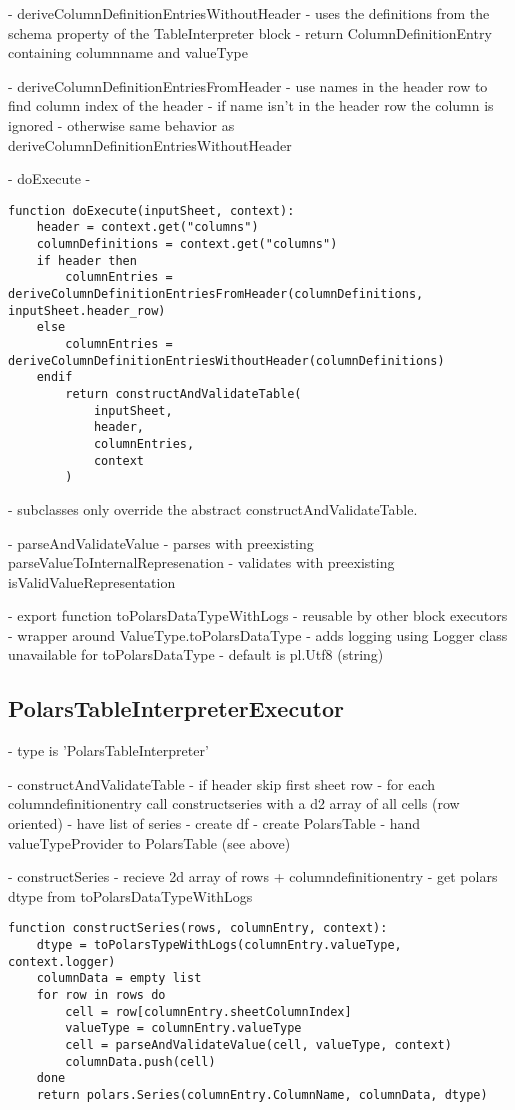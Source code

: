 - deriveColumnDefinitionEntriesWithoutHeader
- uses the definitions from the schema property of the TableInterpreter block
- return ColumnDefinitionEntry containing columnname and valueType

- deriveColumnDefinitionEntriesFromHeader
- use names in the header row to find column index of the header
- if name isn't in the header row the column is ignored
- otherwise same behavior as deriveColumnDefinitionEntriesWithoutHeader

- doExecute
- \begin{listing}
	\begin{verbatim}
function doExecute(inputSheet, context):
	header = context.get("columns")
	columnDefinitions = context.get("columns")
	if header then
		columnEntries = deriveColumnDefinitionEntriesFromHeader(columnDefinitions, inputSheet.header_row)
	else
		columnEntries = deriveColumnDefinitionEntriesWithoutHeader(columnDefinitions)
	endif
		return constructAndValidateTable(
			inputSheet,
			header,
			columnEntries,
			context
		)
	\end{verbatim}
	\caption{}
	\label{lst:tableInterpreter:doExecute}
\end{listing}
- subclasses only override the abstract constructAndValidateTable.

- parseAndValidateValue
- parses with preexisting parseValueToInternalRepresenation
- validates with preexisting isValidValueRepresentation

- export function toPolarsDataTypeWithLogs
- reusable by other block executors
- wrapper around ValueType.toPolarsDataType
- adds logging using Logger class unavailable for toPolarsDataType
- default is pl.Utf8 (string)

\subsection{PolarsTableInterpreterExecutor}
- type is 'PolarsTableInterpreter'

- constructAndValidateTable
- if header skip first sheet row
- for each columndefinitionentry call constructseries with a d2 array of all cells (row oriented)
- have list of series
- create df
- create PolarsTable
- hand valueTypeProvider to PolarsTable (see above)

- constructSeries
- recieve 2d array of rows + columndefinitionentry
- get polars dtype from toPolarsDataTypeWithLogs
\begin{listing}
	\begin{verbatim}
function constructSeries(rows, columnEntry, context):
	dtype = toPolarsTypeWithLogs(columnEntry.valueType, context.logger)
	columnData = empty list
	for row in rows do
		cell = row[columnEntry.sheetColumnIndex]
		valueType = columnEntry.valueType
		cell = parseAndValidateValue(cell, valueType, context)
		columnData.push(cell)
	done
	return polars.Series(columnEntry.ColumnName, columnData, dtype)
	\end{verbatim}
	\caption{}
	\label{lst:polarsTableInterpreter:constructSeries}
\end{listing}

